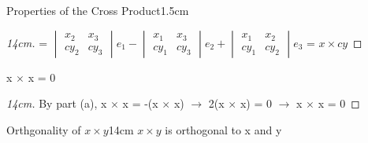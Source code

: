\begin{ltheorem}{Properties of the Cross Product}{1.5cm}
\begin{proof}[14cm]
                \hspace{1.5cm}
                = $\begin{vmatrix}
                    x_2 & x_3 \\
                    cy_2 & cy_3 
                \end{vmatrix}e_1
                - \begin{vmatrix}
                    x_1 & x_3 \\
                    cy_1 & cy_3 
                \end{vmatrix}e_2
                + \begin{vmatrix}
                    x_1 & x_2 \\
                    cy_1 & cy_2 
                \end{vmatrix}e_3$
                = $x \times cy$
            \end{proof}

        \item x $\times$ x = 0
        
            \begin{proof}[14cm]
                By part (a),
                x $\times$ x = -(x $\times$ x)
                \hspace{0.5cm}
                $\rightarrow$
                \hspace{0.5cm}
                2(x $\times$ x) = 0
                \hspace{0.5cm}
                $\rightarrow$
                \hspace{0.5cm}
                x $\times$ x = 0
            \end{proof}
    \end{ltheorem}

    \vspace{0.5cm}



    \begin{wtheorem}{Orthgonality of $x \times y$}{14cm}
        $x \times y$ is orthogonal to x and y
    \end{wtheorem}

